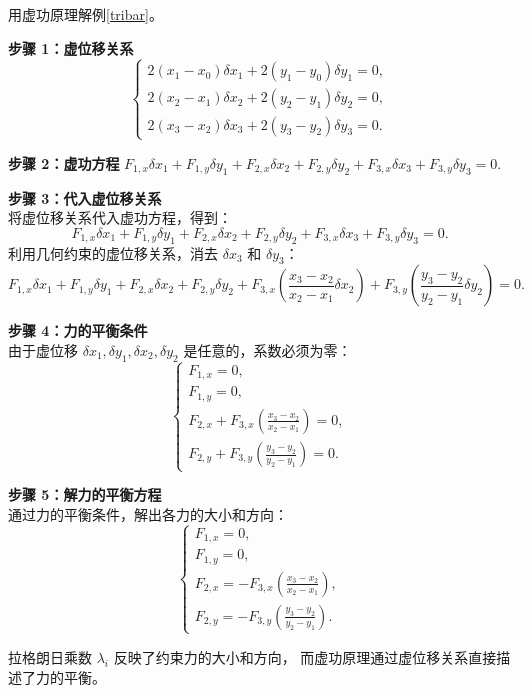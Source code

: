 \documentclass[12pt, a4paper, oneside, UTF8]{ctexbook}  %
\begin{document}
\begin{example}\label{tribarvw}
    用虚功原理解例\ref{tribar}。
    \begin{solution}
        
\noindent \textbf{步骤 1：虚位移关系}
\[
\begin{cases}
2(x_1 - x_0) \delta x_1 + 2(y_1 - y_0) \delta y_1 = 0, \\
2(x_2 - x_1) \delta x_2 + 2(y_2 - y_1) \delta y_2 = 0, \\
2(x_3 - x_2) \delta x_3 + 2(y_3 - y_2) \delta y_3 = 0.
\end{cases}
\]

\noindent \textbf{步骤 2：虚功方程}
\(
F_{1,x} \delta x_1 + F_{1,y} \delta y_1 + F_{2,x} \delta x_2 + F_{2,y} \delta y_2 + F_{3,x} \delta x_3 + F_{3,y} \delta y_3 = 0.
\)

\noindent \textbf{步骤 3：代入虚位移关系} \\
将虚位移关系代入虚功方程，得到：
\[
F_{1,x} \delta x_1 + F_{1,y} \delta y_1 + F_{2,x} \delta x_2 + F_{2,y} \delta y_2 + F_{3,x} \delta x_3 + F_{3,y} \delta y_3 = 0.
\]
利用几何约束的虚位移关系，消去 \( \delta x_3 \) 和 \( \delta y_3 \)：
\[
F_{1,x} \delta x_1 + F_{1,y} \delta y_1 + F_{2,x} \delta x_2 + F_{2,y} \delta y_2 + F_{3,x} \left( \frac{x_3 - x_2}{x_2 - x_1} \delta x_2 \right) + F_{3,y} \left( \frac{y_3 - y_2}{y_2 - y_1} \delta y_2 \right) = 0.
\]

\noindent \textbf{步骤 4：力的平衡条件} \\
由于虚位移 \( \delta x_1, \delta y_1, \delta x_2, \delta y_2 \) 是任意的，系数必须为零：
\[
\begin{cases}
F_{1,x} = 0, \\
F_{1,y} = 0, \\
F_{2,x} + F_{3,x} \left( \frac{x_3 - x_2}{x_2 - x_1} \right) = 0, \\
F_{2,y} + F_{3,y} \left( \frac{y_3 - y_2}{y_2 - y_1} \right) = 0.
\end{cases}
\]

\noindent \textbf{步骤 5：解力的平衡方程} \\
通过力的平衡条件，解出各力的大小和方向：
\[
\begin{cases}
F_{1,x} = 0, \\
F_{1,y} = 0, \\
F_{2,x} = -F_{3,x} \left( \frac{x_3 - x_2}{x_2 - x_1} \right), \\
F_{2,y} = -F_{3,y} \left( \frac{y_3 - y_2}{y_2 - y_1} \right).
\end{cases}
\]
\begin{zhu}
    拉格朗日乘数 \( \lambda_i \) 反映了约束力的大小和方向，
    而虚功原理通过虚位移关系直接描述了力的平衡。
\end{zhu}
    \end{solution}
\end{example}
\end{document}
